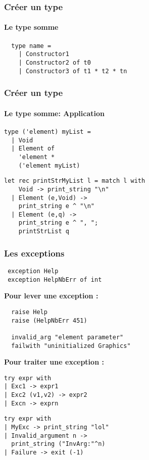 \begin{frame}[fragile]
	\frametitle{Créer un type}
	\framesubtitle{Le type somme}
	\begin{lstlisting}
  type name =
    | Constructor1 
    | Constructor2 of t0 
    | Constructor3 of t1 * t2 * tn 
	\end{lstlisting}
\end{frame}

\begin{frame}[fragile]
	\frametitle{Créer un type}
	\framesubtitle{Le type somme: Application}
			\begin{lstlisting}
type ('element) myList =
  | Void
  | Element of 
    'element * 
    ('element myList)
			\end{lstlisting}

			\begin{lstlisting}
let rec printStrMyList l = match l with
    Void -> print_string "\n"
  | Element (e,Void) -> 
    print_string e ^ "\n"
  | Element (e,q) -> 
    print_string e ^ ", ";
    printStrList q
			\end{lstlisting}
\end{frame}

\begin{frame}[fragile]
	\frametitle{Les exceptions}
	\begin{lstlisting}
 exception Help
 exception HelpNbErr of int
	\end{lstlisting}
	\textbf{Pour lever une exception :}
	\begin{lstlisting}
  raise Help
  raise (HelpNbErr 451)
  
  invalid_arg "element parameter"
  failwith "uninitialized Graphics"
	\end{lstlisting}
	\textbf{Pour traiter une exception :}
	\begin{center}
		\begin{minipage}{4.2cm}
			\lstset{basicstyle=\scriptsize}
			\begin{lstlisting}
try expr with 
| Exc1 -> expr1
| Exc2 (v1,v2) -> expr2
| Excn -> exprn
			\end{lstlisting}
		\end{minipage}
		\begin{minipage}{5cm}
			\lstset{basicstyle=\scriptsize}
			\begin{lstlisting}
try expr with 
| MyExc -> print_string "lol"
| Invalid_argument n -> 
  print_string ("InvArg:"^n)
| Failure -> exit (-1)
			\end{lstlisting}
		\end{minipage}
	\end{center}
\end{frame}
